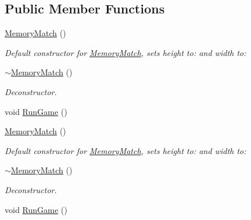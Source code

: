 \subsection*{Public Member Functions}
\begin{DoxyCompactItemize}
\item 
\hyperlink{classMemoryMatch_a7221a0b7d33bf079df51c1f7f52aa2dd}{Memory\-Match} ()
\begin{DoxyCompactList}\small\item\em Default constructor for \hyperlink{classMemoryMatch}{Memory\-Match}, sets height to\-: and width to\-: \end{DoxyCompactList}\item 
\hypertarget{classMemoryMatch_a1b2cf5418b2b26e21b4fd12d880e79b7}{\hyperlink{classMemoryMatch_a1b2cf5418b2b26e21b4fd12d880e79b7}{$\sim$\-Memory\-Match} ()}\label{classMemoryMatch_a1b2cf5418b2b26e21b4fd12d880e79b7}

\begin{DoxyCompactList}\small\item\em Deconstructor. \end{DoxyCompactList}\item 
void \hyperlink{classMemoryMatch_a3973ebb1ab8d44a51bd629bc3b0df370}{Run\-Game} ()
\item 
\hypertarget{classMemoryMatch_a7221a0b7d33bf079df51c1f7f52aa2dd}{\hyperlink{classMemoryMatch_a7221a0b7d33bf079df51c1f7f52aa2dd}{Memory\-Match} ()}\label{classMemoryMatch_a7221a0b7d33bf079df51c1f7f52aa2dd}

\begin{DoxyCompactList}\small\item\em Default constructor for \hyperlink{classMemoryMatch}{Memory\-Match}, sets height to\-: and width to\-: \end{DoxyCompactList}\item 
\hypertarget{classMemoryMatch_a1b2cf5418b2b26e21b4fd12d880e79b7}{\hyperlink{classMemoryMatch_a1b2cf5418b2b26e21b4fd12d880e79b7}{$\sim$\-Memory\-Match} ()}\label{classMemoryMatch_a1b2cf5418b2b26e21b4fd12d880e79b7}

\begin{DoxyCompactList}\small\item\em Deconstructor. \end{DoxyCompactList}\item 
void \hyperlink{classMemoryMatch_a3973ebb1ab8d44a51bd629bc3b0df370}{Run\-Game} ()
\end{DoxyCompactItemize}


